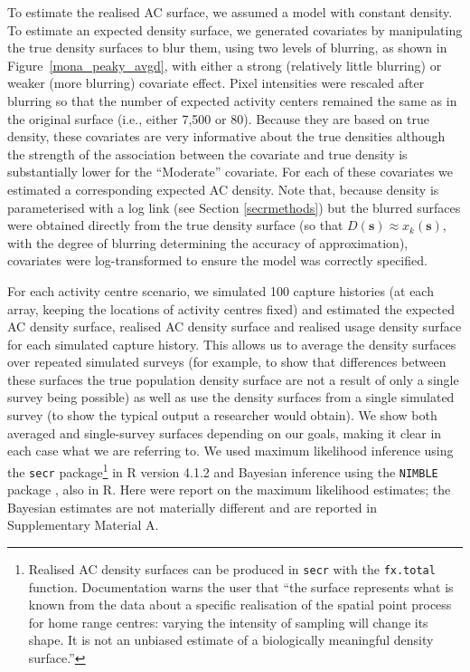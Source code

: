 \documentclass[10pt,a4paper]{article}
\begin{document}
To estimate the realised AC surface, we assumed a model with constant density. To estimate an expected density surface, we generated covariates by manipulating the true density surfaces to blur them, using two levels of blurring, as shown in Figure~\ref{mona_peaky_avgd}, with either a strong (relatively little blurring) or weaker (more blurring) covariate effect. Pixel intensities were rescaled after blurring so that the number of expected activity centers remained the same as in the original surface (i.e., either 7,500 or 80). Because they are based on true density, these covariates are very informative about the true densities although the strength of the association between the covariate and true density is substantially lower for the ``Moderate'' covariate. For each of these covariates we estimated a corresponding expected AC density. Note that, because density is parameterised with a log link (see Section \ref{secrmethods}) but the blurred surfaces were obtained directly from the true density surface (so that $D(\mathbf{s})\approx x_k(\mathbf{s})$, with the degree of blurring determining the accuracy of approximation), covariates were log-transformed to ensure the model was correctly specified.

For each activity centre scenario, we simulated 100 capture histories (at each array, keeping the locations of activity centres fixed) and estimated the expected AC density surface, realised AC density surface and realised usage density surface for each simulated capture history. This allows us to average the density surfaces over repeated simulated surveys (for example, to show that differences between these surfaces the true population density surface are not a result of only a single survey being possible) as well as use the density surfaces from a single simulated survey (to show the typical output a researcher would obtain). We show both averaged and single-survey surfaces depending on our goals, making it clear in each case what we are referring to. We used maximum likelihood inference using the \texttt{secr} package\footnote{Realised AC density surfaces can be produced in \texttt{secr} with the \texttt{fx.total} function. Documentation warns the user that ``the surface represents what is known from the data about a specific realisation of the spatial point process for home range centres: varying the intensity of sampling will change its shape. It is not an unbiased estimate of a biologically meaningful density surface.''} \citep{secr:21} in R version 4.1.2 and Bayesian inference using the \texttt{NIMBLE} package \citep{deValpine:17, Turek:21}, also in R. Here were report on the maximum likelihood estimates; the Bayesian estimates are not materially different and are reported in Supplementary Material A.
\end{document}
